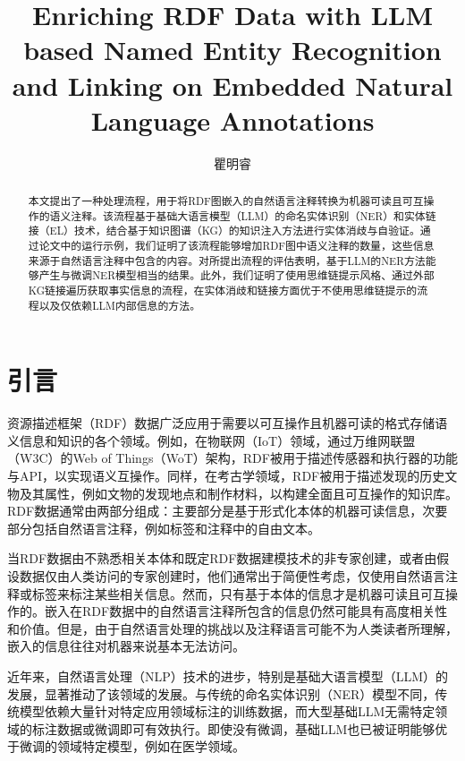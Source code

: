 \documentclass[supercite]{Experimental_Report}
\title{Enriching RDF Data with LLM based Named Entity Recognition and Linking on Embedded Natural Language Annotations}
\author{瞿明睿}
\theoremstyle{definition}
\begin{document}
\maketitle
\clearpage


\begin{abstract}
本文提出了一种处理流程，用于将RDF图嵌入的自然语言注释转换为机器可读且可互操作的语义注释。该流程基于基础大语言模型（LLM）的命名实体识别（NER）和实体链接（EL）技术，结合基于知识图谱（KG）的知识注入方法进行实体消歧与自验证。通过论文中的运行示例，我们证明了该流程能够增加RDF图中语义注释的数量，这些信息来源于自然语言注释中包含的内容。对所提出流程的评估表明，基于LLM的NER方法能够产生与微调NER模型相当的结果。此外，我们证明了使用思维链提示风格、通过外部KG链接遍历获取事实信息的流程，在实体消歧和链接方面优于不使用思维链提示的流程以及仅依赖LLM内部信息的方法。
\end{abstract}


\section{引言}

资源描述框架（RDF）数据广泛应用于需要以可互操作且机器可读的格式存储语义信息和知识的各个领域。例如，在物联网（IoT）领域，通过万维网联盟（W3C）的Web of Things（WoT）架构\cite{ref4}，RDF被用于描述传感器和执行器的功能与API，以实现语义互操作\cite{ref3}。同样，在考古学领域\cite{ref17}，RDF被用于描述发现的历史文物及其属性，例如文物的发现地点和制作材料，以构建全面且可互操作的知识库。RDF数据通常由两部分组成：主要部分是基于形式化本体的机器可读信息，次要部分包括自然语言注释，例如标签和注释中的自由文本。

当RDF数据由不熟悉相关本体和既定RDF数据建模技术的非专家创建，或者由假设数据仅由人类访问的专家创建时，他们通常出于简便性考虑，仅使用自然语言注释或标签来标注某些相关信息。然而，只有基于本体的信息才是机器可读且可互操作的。嵌入在RDF数据中的自然语言注释所包含的信息仍然可能具有高度相关性和价值。但是，由于自然语言处理的挑战以及注释语言可能不为人类读者所理解，嵌入的信息往往对机器来说基本无法访问。

近年来，自然语言处理（NLP）技术的进步，特别是基础大语言模型（LLM）的发展，显著推动了该领域的发展\cite{ref10}。与传统的命名实体识别（NER）模型不同，传统模型依赖大量针对特定应用领域标注的训练数据，而大型基础LLM无需特定领域的标注数据或微调即可有效执行\cite{ref16}。即使没有微调，基础LLM也已被证明能够优于微调的领域特定模型，例如在医学领域\cite{ref14}。
\end{document}
